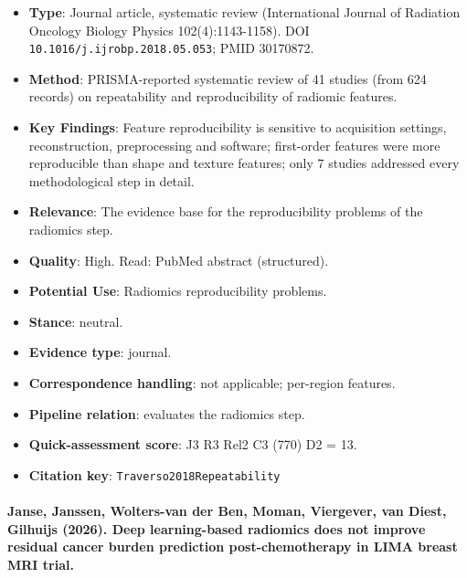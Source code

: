 \documentclass[journal,onecolumn]{IEEEtran}
\begin{document}
\begin{itemize}

\item{} \textbf{Type}: Journal article, systematic review (International Journal of Radiation Oncology Biology Physics 102(4):1143-1158). DOI \nolinkurl{10.1016/j.ijrobp.2018.05.053}; PMID 30170872.

\item{} \textbf{Method}: PRISMA-reported systematic review of 41 studies (from 624 records) on repeatability and reproducibility of radiomic features.

\item{} \textbf{Key Findings}: Feature reproducibility is sensitive to acquisition settings, reconstruction, preprocessing and software; first-order features were more reproducible than shape and texture features; only 7 studies addressed every methodological step in detail.

\item{} \textbf{Relevance}: The evidence base for the reproducibility problems of the radiomics step.

\item{} \textbf{Quality}: High. Read: PubMed abstract (structured).

\item{} \textbf{Potential Use}: Radiomics reproducibility problems.

\item{} \textbf{Stance}: neutral.

\item{} \textbf{Evidence type}: journal.

\item{} \textbf{Correspondence handling}: not applicable; per-region features.

\item{} \textbf{Pipeline relation}: evaluates the radiomics step.

\item{} \textbf{Quick-assessment score}: J3 R3 Rel2 C3 (770) D2 = 13.

\item{} \textbf{Citation key}: \texttt{Traverso2018Repeatability}

\end{itemize}

\paragraph{Janse, Janssen, Wolters-van der Ben, Moman, Viergever, van Diest, Gilhuijs (2026). Deep learning-based radiomics does not improve residual cancer burden prediction post-chemotherapy in LIMA breast MRI trial.~\cite{Janse2026Deep}}\mbox{}
\end{document}
